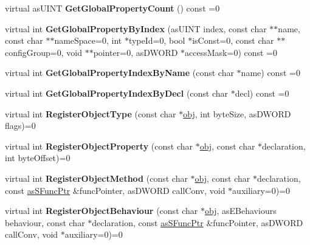 \begin{DoxyCompactItemize}
virtual as\+U\+I\+NT {\bfseries Get\+Global\+Property\+Count} () const =0
\item 
\mbox{\label{classas_i_script_engine_a93bd686853a48647d2136792e27380fb}} 
virtual int {\bfseries Get\+Global\+Property\+By\+Index} (as\+U\+I\+NT index, const char $\ast$$\ast$name, const char $\ast$$\ast$name\+Space=0, int $\ast$type\+Id=0, bool $\ast$is\+Const=0, const char $\ast$$\ast$config\+Group=0, void $\ast$$\ast$pointer=0, as\+D\+W\+O\+RD $\ast$access\+Mask=0) const =0
\item 
\mbox{\label{classas_i_script_engine_a07e85878869e4d0597c1177d767dc717}} 
virtual int {\bfseries Get\+Global\+Property\+Index\+By\+Name} (const char $\ast$name) const =0
\item 
\mbox{\label{classas_i_script_engine_a91a4cc8af51ca439ca82b9b6630439b3}} 
virtual int {\bfseries Get\+Global\+Property\+Index\+By\+Decl} (const char $\ast$decl) const =0
\item 
\mbox{\label{classas_i_script_engine_a29c6c087c8c5b5cdb6271cfd161cc5a6}} 
virtual int {\bfseries Register\+Object\+Type} (const char $\ast$\hyperlink{structobj}{obj}, int byte\+Size, as\+D\+W\+O\+RD flags)=0
\item 
\mbox{\label{classas_i_script_engine_a33f3cd249307f5f11120a395579410f6}} 
virtual int {\bfseries Register\+Object\+Property} (const char $\ast$\hyperlink{structobj}{obj}, const char $\ast$declaration, int byte\+Offset)=0
\item 
\mbox{\label{classas_i_script_engine_a1d42c5d9fd06a07da279f491f8901317}} 
virtual int {\bfseries Register\+Object\+Method} (const char $\ast$\hyperlink{structobj}{obj}, const char $\ast$declaration, const \hyperlink{structas_s_func_ptr}{as\+S\+Func\+Ptr} \&func\+Pointer, as\+D\+W\+O\+RD call\+Conv, void $\ast$auxiliary=0)=0
\item 
\mbox{\label{classas_i_script_engine_ad69bc821a7f1120369c1bd9526f41b9c}} 
virtual int {\bfseries Register\+Object\+Behaviour} (const char $\ast$\hyperlink{structobj}{obj}, as\+E\+Behaviours behaviour, const char $\ast$declaration, const \hyperlink{structas_s_func_ptr}{as\+S\+Func\+Ptr} \&func\+Pointer, as\+D\+W\+O\+RD call\+Conv, void $\ast$auxiliary=0)=0

\end{DoxyCompactItemize}
